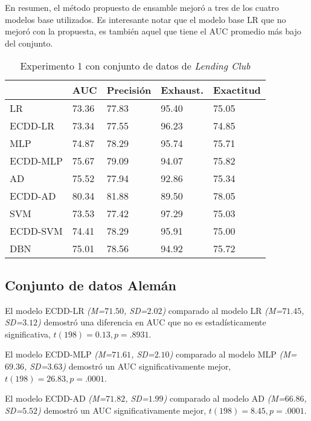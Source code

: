 En resumen, el método propuesto de ensamble mejoró a tres de los cuatro modelos base utilizados. Es interesante notar que el modelo base \ac{LR} que no mejoró con la propuesta, es también aquel que tiene el \ac{AUC} promedio más bajo del conjunto.

\begin{table}[htbp]
\centering
\caption{Experimento 1 con conjunto de datos de \textit{Lending Club}}
\label{tab:lc-proc1}
\begin{tabularx}{0.75\textwidth}{|l|Y Y Y Y|}
				\hline
				& AUC		& Precisión	& Exhaust.		& Exactitud	\\
				\hline
LR				& 73.36		& 77.83		& 95.40			& 75.05		\\		%
ECDD-LR			& 73.34		& 77.55		& 96.23			& 74.85		\\		%
				\hline
MLP				& 74.87		& 78.29		& 95.74			& 75.71		\\		%
ECDD-MLP		& 75.67		& 79.09		& 94.07			& 75.82		\\		%
				\hline
AD				& 75.52		& 77.94		& 92.86			& 75.34		\\		%
ECDD-AD			& 80.34		& 81.88		& 89.50			& 78.05		\\		%
				\hline
SVM				& 73.53		& 77.42		& 97.29			& 75.03		\\		%
ECDD-SVM		& 74.41		& 78.29		& 95.91			& 75.00		\\		%
				\hline
DBN				& 75.01		& 78.56		& 94.92			& 75.72		\\		%
				\hline
\end{tabularx}
\end{table}


\subsection{Conjunto de datos Alemán}

El modelo ECDD-LR \textit{(M=$71.50$, SD=$2.02$)} comparado al modelo \ac{LR} \textit{(M=$71.45$, SD=$3.12$)} demostró una diferencia en \ac{AUC} que no es estadísticamente significativa, $t(198)=0.13, p=.8931$.

El modelo ECDD-MLP \textit{(M=$71.61$, SD=$2.10$)} comparado al modelo \ac{MLP} \textit{(M=$69.36$, SD=$3.63$)} demostró un \ac{AUC} significativamente mejor, $t(198)=26.83, p=.0001$.

El modelo ECDD-AD \textit{(M=$71.82$, SD=$1.99$)} comparado al modelo \ac{AD} \textit{(M=$66.86$, SD=$5.52$)} demostró un \ac{AUC} significativamente mejor, $t(198)=8.45, p=.0001$.

